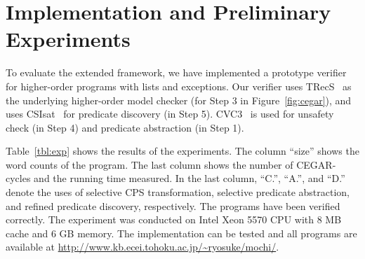 
\vspace{-5pt}
\section{Implementation and Preliminary Experiments}
\label{sec:experiments}

To evaluate the extended framework, we have implemented a prototype
verifier for higher-order programs with lists and exceptions.
Our verifier uses TRecS~\cite{KobayashiPOPL2009,KobayashiPPDP2009} as
the underlying higher-order model checker (for Step 3 in
Figure~\ref{fig:cegar}), and uses CSIsat~\cite{Beyer2008} for predicate
discovery (in Step 5).  CVC3~\cite{Barrett2007} is used for unsafety
check (in Step 4) and predicate abstraction (in Step 1).

Table~\ref{tbl:exp} shows the results of the experiments.  The column
``size'' shows the word counts of the program.  The last column shows
the number of CEGAR-cycles and the running time measured.  In the last
column, ``C.'', ``A.'', and ``D.''  denote the uses of selective CPS
transformation, selective predicate abstraction, and refined predicate
discovery, respectively.  The programs have been verified correctly.
The experiment was conducted on Intel Xeon 5570 CPU with 8 MB cache and
6 GB memory.  The implementation can be tested and all programs are
available at \url{http://www.kb.ecei.tohoku.ac.jp/~ryosuke/mochi/}.

